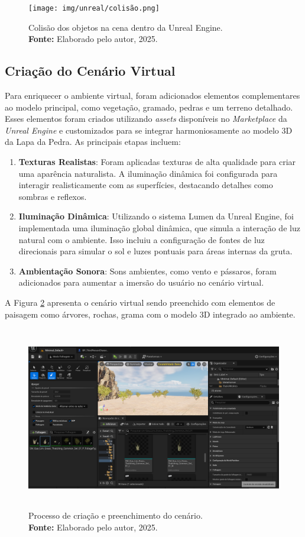 \begin{figure}[H]
        \centering
        \texttt{[image: img/unreal/colisão.png]}
        \caption{Colisão dos objetos na cena dentro da Unreal Engine. \\
            \textbf{Fonte:} Elaborado pelo autor, 2025.}
        \label{fig:colisao}
\end{figure}


\subsection{Criação do Cenário Virtual}
Para enriquecer o ambiente virtual, foram adicionados elementos complementares ao modelo principal, como vegetação, gramado, pedras e um terreno detalhado. Esses elementos foram criados utilizando \textit{assets} disponíveis no \textit{Marketplace} da \textit{Unreal Engine} e customizados para se integrar harmoniosamente ao modelo 3D da Lapa da Pedra. As principais etapas incluem:
\begin{enumerate}
    \item \textbf{Texturas Realistas}: Foram aplicadas texturas de alta qualidade para criar uma aparência naturalista. A iluminação dinâmica foi configurada para interagir realisticamente com as superfícies, destacando detalhes como sombras e reflexos.
    \item \textbf{Iluminação Dinâmica}: Utilizando o sistema Lumen da Unreal Engine, foi implementada uma iluminação global dinâmica, que simula a interação de luz natural com o ambiente. Isso incluiu a configuração de fontes de luz direcionais para simular o sol e luzes pontuais para áreas internas da gruta.
    \item \textbf{Ambientação Sonora}: Sons ambientes, como vento e pássaros, foram adicionados para aumentar a imersão do usuário no cenário virtual.
\end{enumerate}
A Figura \ref{fig:grama} apresenta o cenário virtual sendo preenchido com elementos de paisagem como árvores, rochas, grama com o modelo 3D integrado ao ambiente.
\begin{figure}[H]
        \centering
        \includegraphics[height=8cm, keepaspectratio]{img/unreal/paisagem grass.png}
        \caption{Processo de criação e preenchimento do cenário. \\
            \textbf{Fonte:} Elaborado pelo autor, 2025.}
        \label{fig:grama}
\end{figure}



